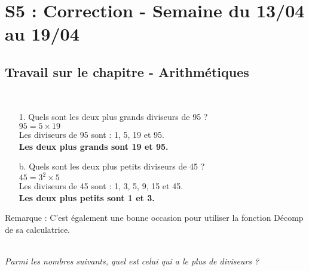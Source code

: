 \documentclass[11pt]{article}
\begin{document}

\newtheorem{Definition}{Définition}
\newtheorem{Theorem}{Théorème}
\newtheorem{Proposition}{Propriété}
\newtheorem{Exo}{Éxercice}

\renewcommand{\labelitemi}{$\bullet$}
\renewcommand{\labelitemii}{$\circ$}

\setlength{\columnseprule}{1pt}

\section*{S5 : Correction - Semaine du 13/04 au 19/04}

\subsection*{Travail sur le chapitre - Arithmétiques}

\\

\begin{enumerate}
    \item[1.] Quels sont les deux plus grands diviseurs de 95 ? \\
    $95 = 5 \times 19$ \\
    Les diviseurs de 95 sont : 1, 5, 19 et 95. \\
    \textbf{Les deux plus grands sont 19 et 95.}\\ 
    \item[b.] Quels sont les deux plus petits diviseurs de 45 ? \\
    $45 = 3^2 \times 5$ \\
    Les diviseurs de 45 sont : 1, 3, 5, 9, 15 et 45.\\
    \textbf{Les deux plus petits sont 1 et 3.}
\end{enumerate}

Remarque : C'est également une bonne occasion pour utiliser la fonction Décomp de sa calculatrice. 

\\

\textit{Parmi les nombres suivants, quel est celui qui a le plus de diviseurs ? }
\end{document}
